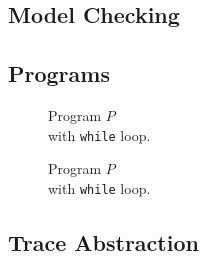 \subsection{Model Checking}

\subsection{Programs}
\begin{figure}[H]
	\centering
	
	\caption{Program $P$ \\ with \texttt{while} loop.}
	\label{code}
\end{figure}

\begin{figure}[H]
	\centering
	
	\caption{Program $P$ \\ with \texttt{while} loop.}
	\label{code}
\end{figure}




\subsection{Trace Abstraction}